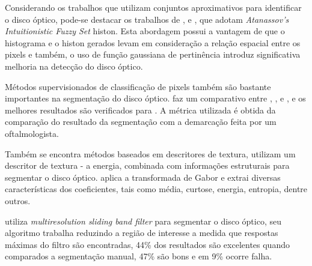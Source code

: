 Considerando os trabalhos que utilizam conjuntos aproximativos para identificar o disco óptico, pode-se destacar os trabalhos de  ,  e , que adotam \textit{Atanassov's Intuitionistic Fuzzy Set}  histon. Esta abordagem possui a vantagem de que o histograma e o histon gerados levam em consideração a relação espacial entre os pixels e também, o uso de função gaussiana de pertinência introduz significativa melhoria na detecção do disco óptico.


Métodos supervisionados de classificação de pixels também são bastante importantes na segmentação do disco  óptico.  faz um comparativo entre , , e , e os melhores resultados são verificados para . A métrica utilizada é obtida da comparação do resultado da segmentação com a demarcação feita por um oftalmologista.

Também se encontra métodos baseados em descritores de textura,  utilizam um descritor de textura - a energia, combinada com informações estruturais para segmentar o disco óptico.  aplica a transformada de Gabor e extrai diversas características dos coeficientes, tais como média, curtose, energia, entropia, dentre outros.

 utiliza \textit{multiresolution sliding band filter} para segmentar o disco óptico, seu algoritmo trabalha reduzindo a região de interesse a medida que respostas máximas do filtro são encontradas, 44\% dos resultados são excelentes quando comparados a segmentação manual, 47\% são bons e em 9\% ocorre falha.

